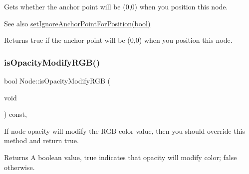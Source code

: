 Gets whether the anchor point will be (0,0) when you position this node.

\begin{DoxySeeAlso}{See also}
{\ttfamily \hyperlink{classNode_a75e8f6a6a46358d6faf8683e720d47b5}{set\+Ignore\+Anchor\+Point\+For\+Position(bool)}}
\end{DoxySeeAlso}
\begin{DoxyReturn}{Returns}
true if the anchor point will be (0,0) when you position this node. 
\end{DoxyReturn}
\mbox{\label{classNode_ae6ce32d2088e2bb3426608334f1091c5}} 
\subsubsection{\texorpdfstring{is\+Opacity\+Modify\+R\+G\+B()}{isOpacityModifyRGB()}\hspace{0.1cm}{\footnotesize\ttfamily [1/2]}}
{\footnotesize\ttfamily bool Node\+::is\+Opacity\+Modify\+R\+GB (\begin{DoxyParamCaption}\item[{void}]{ }\end{DoxyParamCaption}) const\hspace{0.3cm}{\ttfamily [inline]}, {\ttfamily [virtual]}}

If node opacity will modify the R\+GB color value, then you should override this method and return true. \begin{DoxyReturn}{Returns}
A boolean value, true indicates that opacity will modify color; false otherwise. 
\end{DoxyReturn}


